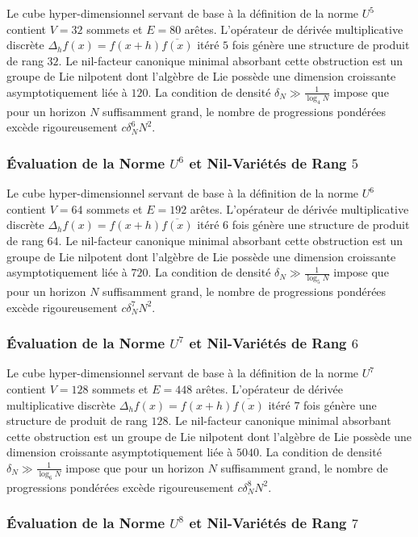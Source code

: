 \documentclass[11pt,a4paper]{article}
\begin{document}
Le cube hyper-dimensionnel servant de base à la définition de la norme $U^{5}$ contient $V = 32$ sommets et $E = 80$ arêtes. L'opérateur de dérivée multiplicative discrète $\Delta_h f(x) = f(x+h)\overline{f(x)}$ itéré $5$ fois génère une structure de produit de rang $32$. Le nil-facteur canonique minimal absorbant cette obstruction est un groupe de Lie nilpotent dont l'algèbre de Lie possède une dimension croissante asymptotiquement liée à $120$. La condition de densité $\delta_N \gg \frac{1}{\log_{4} N}$ impose que pour un horizon $N$ suffisamment grand, le nombre de progressions pondérées excède rigoureusement $c \delta_N^{6} N^2$. \subsubsection{Évaluation de la Norme $U^{6}$ et Nil-Variétés de Rang $5$}
Le cube hyper-dimensionnel servant de base à la définition de la norme $U^{6}$ contient $V = 64$ sommets et $E = 192$ arêtes. L'opérateur de dérivée multiplicative discrète $\Delta_h f(x) = f(x+h)\overline{f(x)}$ itéré $6$ fois génère une structure de produit de rang $64$. Le nil-facteur canonique minimal absorbant cette obstruction est un groupe de Lie nilpotent dont l'algèbre de Lie possède une dimension croissante asymptotiquement liée à $720$. La condition de densité $\delta_N \gg \frac{1}{\log_{5} N}$ impose que pour un horizon $N$ suffisamment grand, le nombre de progressions pondérées excède rigoureusement $c \delta_N^{7} N^2$. \subsubsection{Évaluation de la Norme $U^{7}$ et Nil-Variétés de Rang $6$}
Le cube hyper-dimensionnel servant de base à la définition de la norme $U^{7}$ contient $V = 128$ sommets et $E = 448$ arêtes. L'opérateur de dérivée multiplicative discrète $\Delta_h f(x) = f(x+h)\overline{f(x)}$ itéré $7$ fois génère une structure de produit de rang $128$. Le nil-facteur canonique minimal absorbant cette obstruction est un groupe de Lie nilpotent dont l'algèbre de Lie possède une dimension croissante asymptotiquement liée à $5040$. La condition de densité $\delta_N \gg \frac{1}{\log_{6} N}$ impose que pour un horizon $N$ suffisamment grand, le nombre de progressions pondérées excède rigoureusement $c \delta_N^{8} N^2$. \subsubsection{Évaluation de la Norme $U^{8}$ et Nil-Variétés de Rang $7$}
\end{document}

